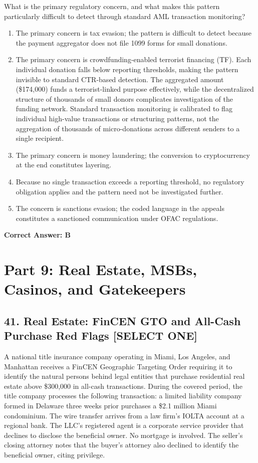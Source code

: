 \documentclass[11pt,a4paper]{article}
\begin{document}
	What is the primary regulatory concern, and what makes this pattern particularly difficult to detect through standard AML transaction monitoring?
	
	\begin{enumerate}[label=\Alph*.]
		\item The primary concern is tax evasion; the pattern is difficult to detect because the payment aggregator does not file 1099 forms for small donations.
		\item The primary concern is crowdfunding-enabled terrorist financing (TF). Each individual donation falls below reporting thresholds, making the pattern invisible to standard CTR-based detection. The aggregated amount (\$174,000) funds a terrorist-linked purpose effectively, while the decentralized structure of thousands of small donors complicates investigation of the funding network. Standard transaction monitoring is calibrated to flag individual high-value transactions or structuring patterns, not the aggregation of thousands of micro-donations across different senders to a single recipient.
		\item The primary concern is money laundering; the conversion to cryptocurrency at the end constitutes layering.
		\item Because no single transaction exceeds a reporting threshold, no regulatory obligation applies and the pattern need not be investigated further.
		\item The concern is sanctions evasion; the coded language in the appeals constitutes a sanctioned communication under OFAC regulations.
	\end{enumerate}
	\textbf{Correct Answer: B}
	
	\section{Part 9: Real Estate, MSBs, Casinos, and Gatekeepers}
	
	\subsection{41. Real Estate: FinCEN GTO and All-Cash Purchase Red Flags \textnormal{[SELECT ONE]}}
	
	A national title insurance company operating in Miami, Los Angeles, and Manhattan receives a FinCEN Geographic Targeting Order requiring it to identify the natural persons behind legal entities that purchase residential real estate above \$300,000 in all-cash transactions. During the covered period, the title company processes the following transaction: a limited liability company formed in Delaware three weeks prior purchases a \$2.1 million Miami condominium. The wire transfer arrives from a law firm's IOLTA account at a regional bank. The LLC's registered agent is a corporate service provider that declines to disclose the beneficial owner. No mortgage is involved. The seller's closing attorney notes that the buyer's attorney also declined to identify the beneficial owner, citing privilege.
	
\end{document}
